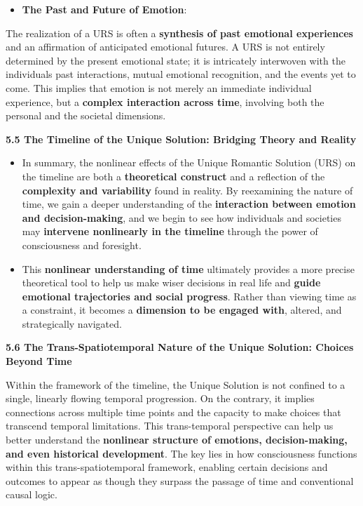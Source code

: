 \documentclass[
]{article}
\begin{document}
\begin{itemize}
\item
  \textbf{The Past and Future of Emotion}:
\end{itemize}

The realization of a URS is often a \textbf{synthesis of past emotional
experiences} and an affirmation of anticipated emotional futures. A URS
is not entirely determined by the present emotional state; it is
intricately interwoven with the individuals\textquotesingle{} past
interactions, mutual emotional recognition, and the events yet to come.
This implies that emotion is not merely an immediate individual
experience, but a \textbf{complex interaction across time}, involving
both the personal and the societal dimensions.

\textbf{5.5 The Timeline of the Unique Solution: Bridging Theory and
Reality}

\begin{itemize}
\item
  In summary, the nonlinear effects of the Unique Romantic Solution
  (URS) on the timeline are both a \textbf{theoretical construct} and a
  reflection of the \textbf{complexity and variability} found in
  reality. By reexamining the nature of time, we gain a deeper
  understanding of the \textbf{interaction between emotion and
  decision-making}, and we begin to see how individuals and societies
  may \textbf{intervene nonlinearly in the timeline} through the power
  of consciousness and foresight.
\item
  This \textbf{nonlinear understanding of time} ultimately provides a
  more precise theoretical tool to help us make wiser decisions in real
  life and \textbf{guide emotional trajectories and social progress}.
  Rather than viewing time as a constraint, it becomes a
  \textbf{dimension to be engaged with}, altered, and strategically
  navigated.
\end{itemize}

\textbf{5.6 The Trans-Spatiotemporal Nature of the Unique Solution:
Choices Beyond Time}

Within the framework of the timeline, the Unique Solution is not
confined to a single, linearly flowing temporal progression. On the
contrary, it implies connections across multiple time points and the
capacity to make choices that transcend temporal limitations. This
trans-temporal perspective can help us better understand the
\textbf{nonlinear structure of emotions, decision-making, and even
historical development}. The key lies in how consciousness functions
within this trans-spatiotemporal framework, enabling certain decisions
and outcomes to appear as though they surpass the passage of time and
conventional causal logic.
\end{document}
